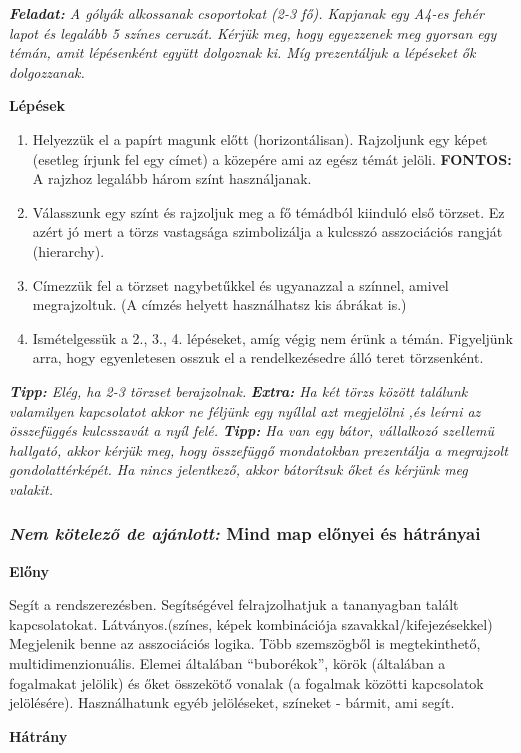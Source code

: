 \documentclass[../Main.tex]{subfiles}
\begin{document}
\textit{\textbf{Feladat:} A gólyák alkossanak csoportokat (2-3 fő).
Kapjanak egy A4-es fehér lapot és legalább 5 színes ceruzát.
Kérjük meg, hogy egyezzenek meg gyorsan egy témán, amit lépésenként együtt dolgoznak ki.
Míg prezentáljuk a lépéseket ők dolgozzanak.}

\vspace*{1\baselineskip}

\textbf{Lépések}
\begin{enumerate}[label=\arabic*]
    \item Helyezzük el a papírt magunk előtt (horizontálisan).
    Rajzoljunk egy képet (esetleg írjunk fel egy címet) a közepére ami az egész témát jelöli.
    \textbf{FONTOS:} A rajzhoz legalább három színt használjanak.

    \item Válasszunk egy színt és rajzoljuk meg a fő témádból kiinduló első törzset.
    Ez azért jó mert a törzs vastagsága szimbolizálja a kulcsszó asszociációs rangját (hierarchy).

    \item Címezzük fel a törzset nagybetűkkel és ugyanazzal a színnel, amivel megrajzoltuk.
    (A címzés helyett használhatsz kis ábrákat is.)

    \item Ismételgessük a 2., 3., 4. lépéseket, amíg végig nem érünk a témán. Figyeljünk arra, hogy egyenletesen osszuk el a rendelkezésedre álló teret törzsenként.
   
\end{enumerate}
\textit{\textbf{Tipp:} Elég, ha 2-3 törzset berajzolnak.} \newline
\textit{\textbf{Extra:} Ha két törzs között találunk valamilyen kapcsolatot akkor ne
féljünk egy nyíllal azt megjelölni ,és leírni az összefüggés kulcsszavát a nyíl felé.} \newline
\textit{\textbf{Tipp:} Ha van egy bátor, vállalkozó szellemü hallgató, akkor kérjük meg,
hogy összefüggő mondatokban prezentálja a megrajzolt gondolattérképét. Ha nincs jelentkező,
akkor bátorítsuk őket és kérjünk meg valakit.}

\subsubsection{\textit{Nem kötelező de ajánlott:} Mind map előnyei és hátrányai}

\textbf{Előny}

\begin{flushleft}
    Segít a rendszerezésben.
    Segítségével felrajzolhatjuk a tananyagban talált kapcsolatokat.
    Látványos.(színes, képek kombinációja szavakkal/kifejezésekkel)
    Megjelenik benne az asszociációs logika.
    Több szemszögből is megtekinthető, multidimenzionuális.
    Elemei általában “buborékok”, körök (általában a fogalmakat jelölik) és őket összekötő vonalak 
    (a fogalmak közötti kapcsolatok jelölésére).
    Használhatunk egyéb jelöléseket, színeket - bármit, ami segít.
\end{flushleft}
\textbf{Hátrány}
\end{document}
